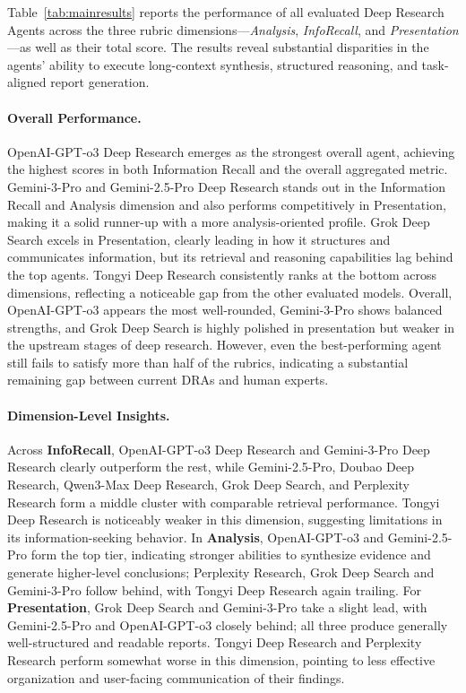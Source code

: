 \documentclass[11pt]{article}
\begin{document}
Table~\ref{tab:mainresults} reports the performance of all evaluated Deep Research Agents across the three rubric dimensions---\textit{Analysis}, \textit{InfoRecall}, and \textit{Presentation}---as well as their total score. The results reveal substantial disparities in the agents' ability to execute long-context synthesis, structured reasoning, and task-aligned report generation.

\paragraph{Overall Performance.}
OpenAI-GPT-o3 Deep Research emerges as the strongest overall agent, achieving the highest scores in both Information Recall and the overall aggregated metric. Gemini-3-Pro and Gemini-2.5-Pro Deep Research stands out in the Information Recall and Analysis dimension and also performs competitively in Presentation, making it a solid runner-up with a more analysis-oriented profile. Grok Deep Search excels in Presentation, clearly leading in how it structures and communicates information, but its retrieval and reasoning capabilities lag behind the top agents. Tongyi Deep Research consistently ranks at the bottom across dimensions, reflecting a noticeable gap from the other evaluated models. Overall, OpenAI-GPT-o3 appears the most well-rounded, Gemini-3-Pro shows balanced strengths, and Grok Deep Search is highly polished in presentation but weaker in the upstream stages of deep research. However, even the best-performing agent still fails to satisfy more than half of the rubrics, indicating a substantial remaining gap between current DRAs and human experts.

\paragraph{Dimension-Level Insights.}
Across \textbf{InfoRecall}, OpenAI-GPT-o3 Deep Research and Gemini-3-Pro Deep Research clearly outperform the rest, while Gemini-2.5-Pro, Doubao Deep Research, Qwen3-Max Deep Research, Grok Deep Search, and Perplexity Research form a middle cluster with comparable retrieval performance. Tongyi Deep Research is noticeably weaker in this dimension, suggesting limitations in its information-seeking behavior. In \textbf{Analysis}, OpenAI-GPT-o3 and Gemini-2.5-Pro form the top tier, indicating stronger abilities to synthesize evidence and generate higher-level conclusions; Perplexity Research, Grok Deep Search and Gemini-3-Pro follow behind, with Tongyi Deep Research again trailing. For \textbf{Presentation}, Grok Deep Search and Gemini-3-Pro take a slight lead, with Gemini-2.5-Pro and OpenAI-GPT-o3 closely behind; all three produce generally well-structured and readable reports. Tongyi Deep Research and Perplexity Research perform somewhat worse in this dimension, pointing to less effective organization and user-facing communication of their findings.
\end{document}
